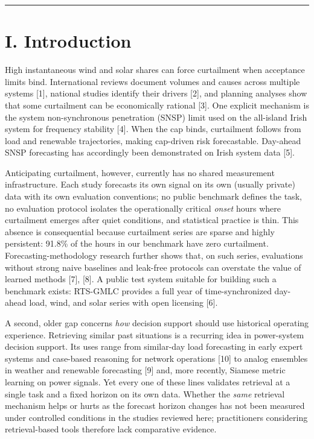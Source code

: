 \documentclass[
  10pt,
  a4paper,
]{article}
\begin{document}
\begin{center}\rule{0.5\linewidth}{0.5pt}\end{center}

\section{I. Introduction}\label{i.-introduction}

High instantaneous wind and solar shares can force curtailment when
acceptance limits bind. International reviews document volumes and
causes across multiple systems {[}1{]}, national studies identify their
drivers {[}2{]}, and planning analyses show that some curtailment can be
economically rational {[}3{]}. One explicit mechanism is the system
non-synchronous penetration (SNSP) limit used on the all-island Irish
system for frequency stability {[}4{]}. When the cap binds, curtailment
follows from load and renewable trajectories, making cap-driven risk
forecastable. Day-ahead SNSP forecasting has accordingly been
demonstrated on Irish system data {[}5{]}.

Anticipating curtailment, however, currently has no shared measurement
infrastructure. Each study forecasts its own signal on its own (usually
private) data with its own evaluation conventions; no public benchmark
defines the task, no evaluation protocol isolates the operationally
critical \emph{onset} hours where curtailment emerges after quiet
conditions, and statistical practice is thin. This absence is
consequential because curtailment series are sparse and highly
persistent: 91.8\% of the hours in our benchmark have zero curtailment.
Forecasting-methodology research further shows that, on such series,
evaluations without strong naive baselines and leak-free protocols can
overstate the value of learned methods {[}7{]}, {[}8{]}. A public test
system suitable for building such a benchmark exists: RTS-GMLC provides
a full year of time-synchronized day-ahead load, wind, and solar series
with open licensing {[}6{]}.

A second, older gap concerns \emph{how} decision support should use
historical operating experience. Retrieving similar past situations is a
recurring idea in power-system decision support. Its uses range from
similar-day load forecasting in early expert systems and case-based
reasoning for network operations {[}10{]} to analog ensembles in weather
and renewable forecasting {[}9{]} and, more recently, Siamese metric
learning on power signals. Yet every one of these lines validates
retrieval at a single task and a fixed horizon on its own data. Whether
the \emph{same} retrieval mechanism helps or hurts as the forecast
horizon changes has not been measured under controlled conditions in the
studies reviewed here; practitioners considering retrieval-based tools
therefore lack comparative evidence.
\end{document}
